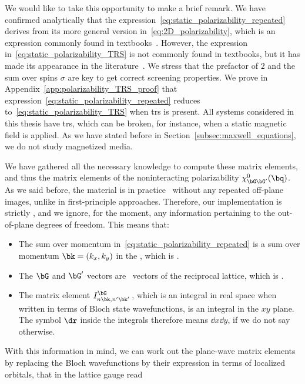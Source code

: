 \noindent We would like to take this opportunity to make a brief remark.
We have confirmed analytically that the expression~\eqref{eq:static_polarizability_repeated} derives from its more general version in~\eqref{eq:2D_polarizability}, which is an expression commonly found in textbooks~\cite{Cohen_Louie_2016}.
However, the expression in~\eqref{eq:static_polarizability_TRS} is not commonly found in textbooks, but it has made its appearance in the literature~\cite{BerkeleyGW,Yambo_2009}.
We stress that the prefactor of $2$ and the sum over spins $\sigma$ are key to get correct screening properties.
We prove in Appendix~\ref{app:polarizability_TRS_proof} that expression~\eqref{eq:static_polarizability_repeated} reduces to~\eqref{eq:static_polarizability_TRS} when \gls{trs} is present.
All systems considered in this thesis have \gls{trs}, which can be broken, for instance, when a static magnetic field is applied.
As we have stated before in Section~\ref{subsec:maxwell_equations}, we do not study magnetized media.

We have gathered all the necessary knowledge to compute these matrix elements, and thus the matrix elements of the noninteracting polarizability $\chi^0_{\bG \bG'}(\bq)$.
As we said before, the material is in practice \bd~without any repeated off-plane images, unlike in first-principle approaches.
Therefore, our implementation is strictly \bd, and we ignore, for the moment, any information pertaining to the out-of-plane degrees of freedom.
This means that:

\begin{itemize}
    \item The sum over momentum in~\eqref{eq:static_polarizability_repeated} is a sum over momentum $\bk = (k_x,k_y)$ in the \bz, which is \bd\@.
    \item The $\bG$ and $\bG'$ vectors are \bd~vectors of the reciprocal lattice, which is \bd.
    \item The matrix element $I^{\bG}_{n \bk, n' \bk'}$\,, which is an integral in real space when written in terms of Bloch state wavefunctions, is an integral in the $xy$ plane.
          The symbol $\dr$ inside the integrals therefore means $\dd x \dd y$, if we do not say otherwise.
\end{itemize}

\noindent With this information in mind, we can work out the plane-wave matrix elements by replacing the Bloch wavefunctions by their expression in terms of localized orbitals, that in the lattice gauge read

